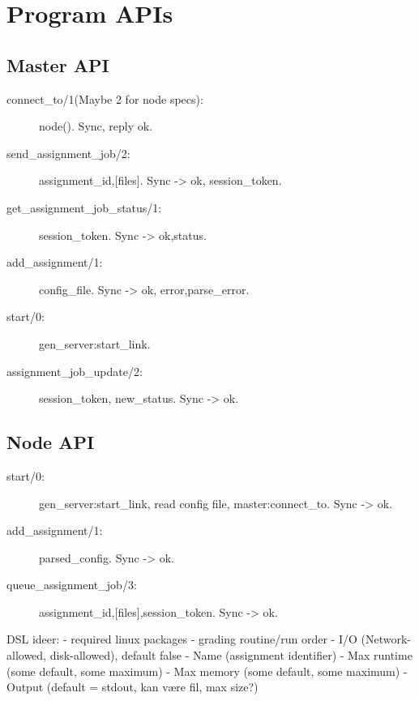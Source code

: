 \section*{Program APIs}
\subsection*{Master API}
\begin{description}
  \item[connect\_to/1(Maybe 2 for node specs):] node(). Sync, reply ok.
  \item[send\_assignment\_job/2:] assignment\_id,[files]. Sync -> {ok, session\_token}.
  \item[get\_assignment\_job\_status/1:] session\_token. Sync -> {ok,status}.
  \item[add\_assignment/1:] config\_file. Sync -> ok, {error,parse\_error}.
  \item[start/0:] gen\_server:start\_link.
  \item[assignment\_job\_update/2:] session\_token, new\_status. Sync -> ok. 
\end{description}
\subsection*{Node API}
\begin{description}
    \item[start/0:] gen\_server:start\_link, read config file, master:connect\_to. Sync -> ok.
    \item[add\_assignment/1:] parsed\_config. Sync -> ok.
    \item[queue\_assignment\_job/3:] assignment\_id,[files],session\_token. Sync -> ok.
\end{description}

DSL ideer:
- required linux packages
- grading routine/run order
- I/O (Network-allowed, disk-allowed), default false
- Name (assignment identifier)
- Max runtime (some default, some maximum)
- Max memory (some default, some maximum)
- Output (default = stdout, kan være fil, max size?)

